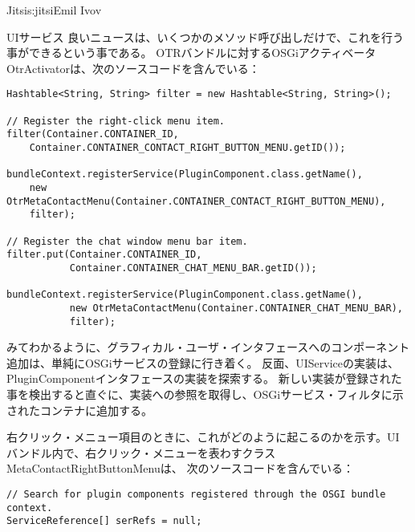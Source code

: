 \begin{aosachapter}{Jitsi}{s:jitsi}{Emil Ivov}
\begin{aosasect1}{UIサービス}
良いニュースは、いくつかのメソッド呼び出しだけで、これを行う事ができるという事である。
OTRバンドルに対するOSGiアクティベータ OtrActivatorは、次のソースコードを含んでいる：

\begin{verbatim}
Hashtable<String, String> filter = new Hashtable<String, String>();

// Register the right-click menu item.
filter(Container.CONTAINER_ID,
    Container.CONTAINER_CONTACT_RIGHT_BUTTON_MENU.getID());

bundleContext.registerService(PluginComponent.class.getName(),
    new OtrMetaContactMenu(Container.CONTAINER_CONTACT_RIGHT_BUTTON_MENU),
    filter);

// Register the chat window menu bar item.
filter.put(Container.CONTAINER_ID,
           Container.CONTAINER_CHAT_MENU_BAR.getID());

bundleContext.registerService(PluginComponent.class.getName(),
           new OtrMetaContactMenu(Container.CONTAINER_CHAT_MENU_BAR),
           filter);
\end{verbatim}

みてわかるように、グラフィカル・ユーザ・インタフェースへのコンポーネント追加は、単純にOSGiサービスの登録に行き着く。
反面、UIServiceの実装は、PluginComponentインタフェースの実装を探索する。
新しい実装が登録された事を検出すると直ぐに、実装への参照を取得し、OSGiサービス・フィルタに示されたコンテナに追加する。

右クリック・メニュー項目のときに、これがどのように起こるのかを示す。UIバンドル内で、右クリック・メニューを表わすクラス MetaContactRightButtonMenuは、
次のソースコードを含んでいる：

\begin{verbatim}
// Search for plugin components registered through the OSGI bundle context.
ServiceReference[] serRefs = null;


\end{verbatim}
\end{aosasect1}
\end{aosachapter}
